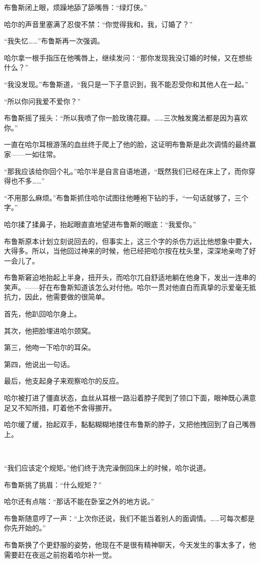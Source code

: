 \documentclass[../main.tex]{subfiles}
\begin{document}
布鲁斯闭上眼，烦躁地舔了舔嘴唇：“绿灯侠。”

哈尔的声音里塞满了忍俊不禁：“你觉得我和，我，订婚了？”

“我失忆……”布鲁斯再一次强调。

哈尔拿一根手指压在他嘴唇上，继续发问：“那你发现我没订婚的时候，又在想些什么？”

“我没发现。”布鲁斯道，“我只是一下子意识到，我不能忍受你和其他人在一起。”

“所以你问我爱不爱你？”

布鲁斯摇了摇头：“所以我喷了你一脸玫瑰花瓣。……三次触发魔法都是因为喜欢你。”

一直在哈尔耳根游荡的血丝终于爬上了他的脸，这证明布鲁斯是此次调情的最终赢家——一如往常。

“那我应该给你回个礼。”哈尔半是自言自语地道，“既然我们已经在床上了，而你穿得也不多……”

“不用那么麻烦。”布鲁斯抓住哈尔试图往他睡袍下钻的手，“一句话就够了，三个字。”

哈尔揉了揉鼻子，抬起眼直直地望进布鲁斯的眼底：“我爱你。”

布鲁斯原本计划立刻说回去的，但事实上，这三个字的杀伤力远比他想象中要大，大得多。所以，当他回过神来的时候，他已经把哈尔按在枕头里，深深地亲吻了好一会儿了。

布鲁斯窘迫地抬起上半身，扭开头，而哈尔兀自舒适地躺在他身下，发出一连串的笑声。——好在布鲁斯知道该怎么对付他。哈尔一贯对他直白而真挚的示爱毫无抵抗力，因此，他需要做的很简单。

首先，他趴回哈尔身上。

其次，他把脸埋进哈尔颈窝。

第三，他吻一下哈尔的耳朵。

第四，他说出一句话。

最后，他支起身子来观察哈尔的反应。

哈尔被打进了僵直状态，血丝从耳根一路沿着脖子爬到了领口下面，眼神既心满意足又不知所措，盯着他不舍得挪开。

哈尔缓了缓，抬起双手，黏黏糊糊地搂住布鲁斯的脖子，又把他拽回到了自己嘴唇上。

~\

“我们应该定个规矩。”他们终于洗完澡倒回床上的时候，哈尔说道。

布鲁斯挑了挑眉：“什么规矩？”

哈尔还有点喘：“那话不能在卧室之外的地方说。”

布鲁斯随意哼了一声：“上次你还说，我们不能当着别人的面调情。……可每次都是你先开始的。”

布鲁斯换了个更舒服的姿势，他现在不是很有精神聊天，今天发生的事太多了，他需要赶在夜巡之前抱着哈尔补一觉。
\end{document}
